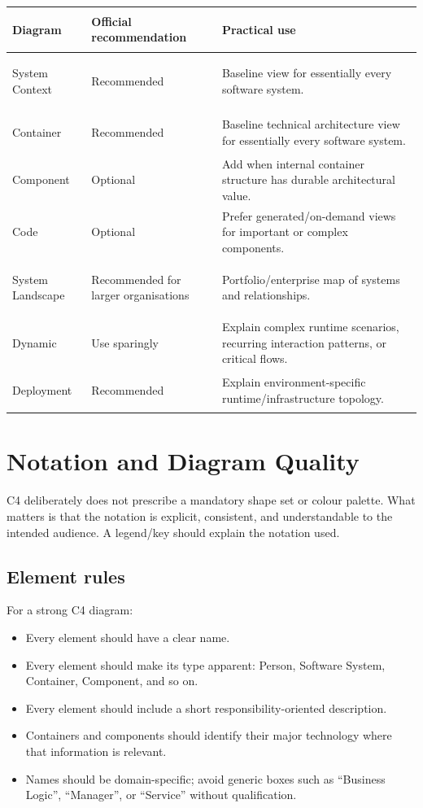 \documentclass[11pt]{article}
\begin{document}
\begin{tabularx}{\textwidth}{>{\bfseries\raggedright\arraybackslash}p{} >{\raggedright\arraybackslash}p{} X}
\toprule
Diagram & Official recommendation & Practical use \\
\midrule
System Context & Recommended & Baseline view for essentially every software system. \\
Container & Recommended & Baseline technical architecture view for essentially every software system. \\
Component & Optional & Add when internal container structure has durable architectural value. \\
Code & Optional & Prefer generated/on-demand views for important or complex components. \\
System Landscape & Recommended for larger organisations & Portfolio/enterprise map of systems and relationships. \\
Dynamic & Use sparingly & Explain complex runtime scenarios, recurring interaction patterns, or critical flows. \\
Deployment & Recommended & Explain environment-specific runtime/infrastructure topology. \\
\bottomrule
\end{tabularx}

\section{Notation and Diagram Quality}

C4 deliberately does not prescribe a mandatory shape set or colour palette. What matters is that the notation is explicit, consistent, and understandable to the intended audience. A legend/key should explain the notation used.\cite{c4notation}

\subsection{Element rules}

For a strong C4 diagram:\cite{c4notation}
\begin{itemize}
  \item Every element should have a clear name.
  \item Every element should make its type apparent: Person, Software System, Container, Component, and so on.
  \item Every element should include a short responsibility-oriented description.
  \item Containers and components should identify their major technology where that information is relevant.
  \item Names should be domain-specific; avoid generic boxes such as ``Business Logic'', ``Manager'', or ``Service'' without qualification.
\end{itemize}
\end{document}
